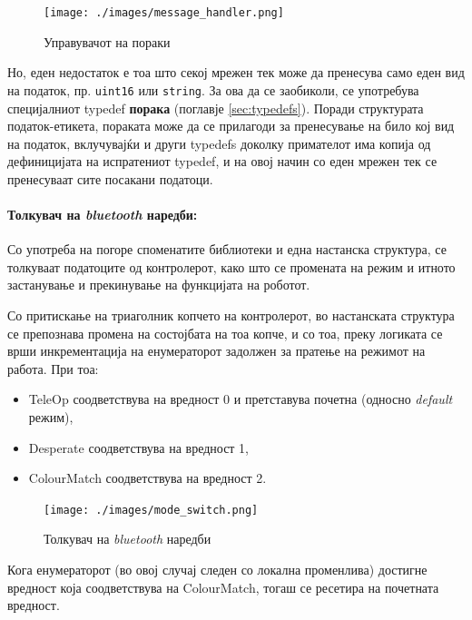 \documentclass[11pt]{article}
\begin{document}
      \begin{figure}[H]
        \centering
        \texttt{[image: ./images/message\_handler.png]}
        \caption{Управувачот на пораки}
        \label{fig:msg_handler}
        \end{figure}

      Но, еден недостаток е тоа што секој мрежен тек може да пренесува само еден вид на податок, пр. \verb+uint16+ или \verb+string+. За ова да се заобиколи, се употребува специјалниот typedef \textbf{порака} (поглавје \ref{sec:typedefs}). Поради структурата податок-етикета, пораката може да се прилагоди за пренесување на било кој вид на податок, вклучувајќи и други typedefs доколку примателот има копија од дефиницијата на испратениот typedef, и на овој начин со еден мрежен тек се пренесуваат сите посакани податоци.

    \paragraph{Толкувач на \textit{bluetooth} наредби:\\}
      Со употреба на погоре споменатите библиотеки и една настанска структура, се толкуваат податоците од контролерот, како што се промената на режим и итното застанување и прекинување на функцијата на роботот.

      Со притискање на триаголник копчето на контролерот, во настанската структура се препознава промена на состојбата на тоа копче, и со тоа, преку логиката се врши инкрементација на енумераторот задолжен за пратење на режимот на работа. При тоа:

      \begin{itemize}
        \item TeleOp соодветствува на вредност 0 и претставува почетна (односно \textit{default} режим),
        \item Desperate соодветствува на вредност 1,
        \item ColourMatch соодветствува на вредност 2.
        \end{itemize}

      \begin{figure}[H]
        \centering
        \texttt{[image: ./images/mode\_switch.png]}
        \caption{Толкувач на \textit{bluetooth} наредби}
        \end{figure}

      Кога енумераторот (во овој случај следен со локална променлива) достигне вредност која соодветствува на ColourMatch, тогаш се ресетира на почетната вредност.
\end{document}
